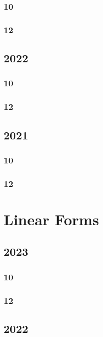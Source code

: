 \documentclass[11pt]{book}
\begin{document}
\subsection{10}

\subsection{12}

\section{2022}
\subsection{10}

\subsection{12}

\section{2021}
\subsection{10}

\subsection{12}

\chapter{Linear Forms}
\section{2023}
\subsection{10}

\subsection{12}                                                                                                  

\section{2022}

\end{document}
